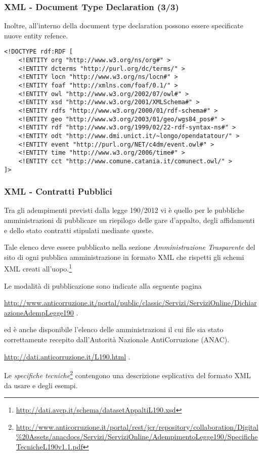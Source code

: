 \documentclass[8pt]{beamer}
\begin{document}
\begin{frame}[fragile]
 \frametitle{XML - Document Type Declaration (3/3)}
 Inoltre, all'interno della document type declaration possono essere
 specificate nuove entity refence.

\begin{small}
\begin{verbatim}
<!DOCTYPE rdf:RDF [
    <!ENTITY org "http://www.w3.org/ns/org#" >
    <!ENTITY dcterms "http://purl.org/dc/terms/" >
    <!ENTITY locn "http://www.w3.org/ns/locn#" >
    <!ENTITY foaf "http://xmlns.com/foaf/0.1/" >
    <!ENTITY owl "http://www.w3.org/2002/07/owl#" >
    <!ENTITY xsd "http://www.w3.org/2001/XMLSchema#" >
    <!ENTITY rdfs "http://www.w3.org/2000/01/rdf-schema#" >
    <!ENTITY geo "http://www.w3.org/2003/01/geo/wgs84_pos#" >
    <!ENTITY rdf "http://www.w3.org/1999/02/22-rdf-syntax-ns#" >
    <!ENTITY odt "http://www.dmi.unict.it/~longo/opendatatour/" >
    <!ENTITY event "http://purl.org/NET/c4dm/event.owl#" >
    <!ENTITY time "http://www.w3.org/2006/time#" >
    <!ENTITY cct "http://www.comune.catania.it/comunect.owl/" >
]>
\end{verbatim}
\end{small}
\end{frame}

\begin{frame}
 \frametitle{XML - Contratti Pubblici}
 
 Tra gli adempimenti previsti dalla legge 190/2012
 vi \`e quello per le pubbliche amministrazioni di pubblicare
 un riepilogo delle gare d'appalto, degli affidamenti e dello 
 stato contratti stipulati mediante queste.
 \vspace{\baselineskip}
 
 Tale elenco deve essere pubblicato nella sezione \emph{Amministrazione
 Trasparente} del sito di ogni pubblica amministrazione in formato 
 XML che rispetti gli schemi XML creati all'uopo.\footnote{\url{http://dati.avcp.it/schema/datasetAppaltiL190.xsd}}
 
 Le modalit\`a di pubblicazione sono indicate alla seguente pagina
 \begin{center}
  \begin{small}
   \url{http://www.anticorruzione.it/portal/public/classic/Servizi/ServiziOnline/DichiarazioneAdempLegge190} .
  \end{small}
 \end{center}
 ed \`e anche disponibile l'elenco delle amministrazioni il cui file sia stato 
 correttamente recepito dall'Autorit\`a Nazionale AntiCorruzione (ANAC).
 \begin{center}
  \begin{small}
   \url{http://dati.anticorruzione.it/L190.html} .
  \end{small}
 \end{center} 
 
 Le \emph{specifiche tecniche}\footnote{\url{http://www.anticorruzione.it/portal/rest/jcr/repository/collaboration/Digital\%20Assets/anacdocs/Servizi/ServiziOnline/AdempimentoLegge190/SpecificheTecnicheL190v1.1.pdf}}
 contengono una descrizione esplicativa del formato XML da usare e degli esempi.
\end{frame}
\end{document}
